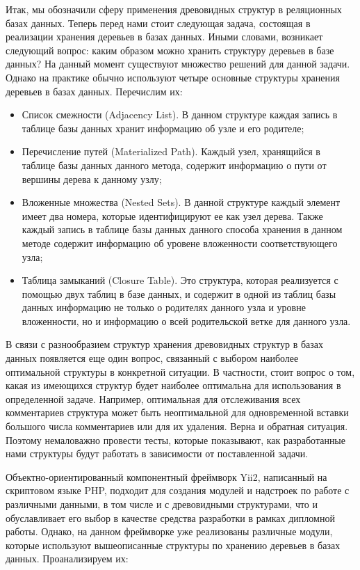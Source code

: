 \documentclass[a4paper,14pt]{extreport}
\theoremstyle{definition}
\begin{document}
Итак, мы обозначили сферу применения древовидных структур в реляционных базах данных. Теперь перед нами стоит следующая задача, состоящая в реализации хранения деревьев в базах данных. Иными словами, возникает следующий вопрос: каким образом можно хранить структуру деревьев в базе данных?
На данный момент существуют множество решений для данной задачи. Однако на практике обычно используют четыре основные структуры хранения деревьев в базах данных. Перечислим их\cite{Karwin}:
\begin{itemize}
\item Список смежности (Adjacency List). В данном структуре каждая запись в таблице базы данных хранит информацию об узле и его родителе;
\item Перечисление путей (Materialized Path). Каждый узел, хранящийся в таблице базы данных данного метода, содержит информацию о пути от вершины дерева к данному узлу;
\item Вложенные множества (Nested Sets). В данной структуре каждый элемент имеет два номера, которые идентифицируют ее как узел дерева. Также каждый запись в таблице базы данных данного способа хранения в данном методе содержит информацию об уровене вложенности соответствующего узла;
\item Таблица замыканий (Closure Table). Это структура, которая реализуется с помощью двух таблиц в базе данных, и содержит в одной из таблиц базы данных информацию не только о родителях данного узла и уровне вложенности, но и информацию о всей родительской ветке для данного узла.
\end{itemize}

В связи с разнообразием структур хранения древовидных структур в базах данных появляется еще один вопрос, связанный с выбором наиболее оптимальной структуры в конкретной ситуации. В частности, стоит вопрос о том, какая из имеющихся структур будет наиболее оптимальна для использования в определенной задаче. Например, оптимальная для отслеживания всех комментариев структура может быть неоптимальной для одновременной вставки большого числа комментариев или для их удаления. Верна и обратная ситуация. Поэтому немаловажно провести тесты, которые показывают, как разработанные нами структуры будут работать в зависимости от поставленной задачи.

Объектно-ориентированный компонентный фреймворк Yii2, написанный на скриптовом языке PHP, подходит для создания модулей и надстроек по работе с различными данными, в том числе и с древовидными структурами, что и обуславливает его выбор в качестве средства разработки в рамках дипломной работы. Однако, на данном фреймворке уже реализованы различные модули, которые используют вышеописанные структуры по хранению деревьев в базах данных. Проанализируем их:
\end{document}
